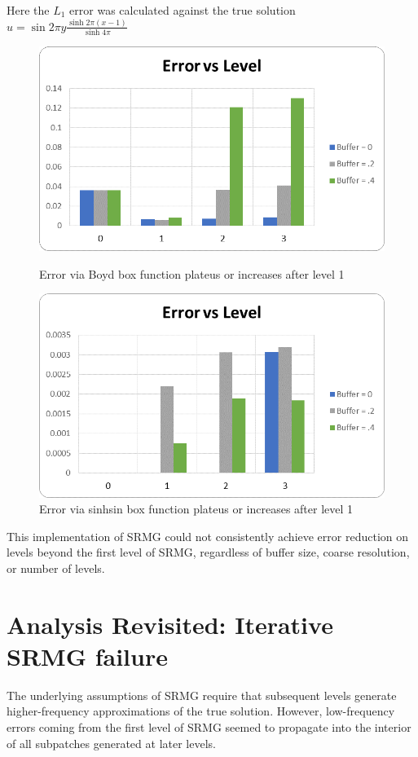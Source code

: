 \documentclass[final]{siamart1116}
\numberwithin{theorem}{section}
\begin{document}
Here the $L_1$ error was calculated against the true solution $u = \sin{2\pi y}\frac{\sinh{2 \pi (x-1)} }{\sinh{4\pi}}$

\begin{figure}[H]
{}
  \includegraphics[width=\linewidth]{convergencechebsinhsin.png}
  \caption{Error via Boyd box function plateus or increases after level 1}
\endminipage\hfill
{}%
  \includegraphics[width=\linewidth]{convergencefouriersinhsin.png}
  \caption{Error via sinhsin box function plateus or increases after level 1}
\endminipage
\end{figure}


This implementation of SRMG could not consistently achieve error reduction on levels beyond the first level of SRMG, regardless of buffer size, coarse resolution, or number of levels. 

\section{Analysis Revisited: Iterative SRMG failure}
The underlying assumptions of SRMG require that subsequent levels generate higher-frequency approximations of the true solution. However, low-frequency errors coming from the first level of SRMG seemed to propagate into the interior of all subpatches generated at later levels.  
\end{document}
